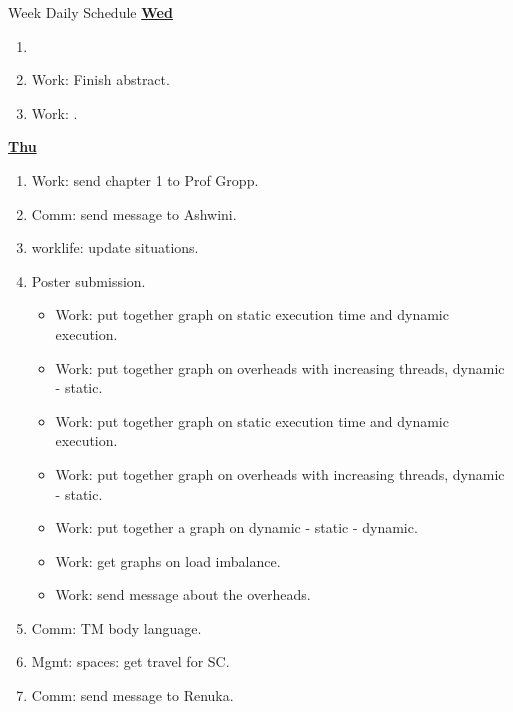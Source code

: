 \documentclass[serif, mathserif, final]{beamer}
\begin{document}
\begin{frame}{}
\begin{columns}
\begin{column}{0.50\linewidth}
\begin{block}{Week Daily Schedule}
\textbf{\small {\underline{Wed}}}
\begin{enumerate} 
\tiny \item \tiny  
\item \tiny Work: Finish abstract. 
\item \tiny Work: .
\end{enumerate} 

\textbf{\small{\underline{Thu}}}
\begin{enumerate} 
\item \tiny Work: send chapter 1 to Prof Gropp.  
\item \tiny Comm: send message to Ashwini.
\item \tiny worklife: update situations.
\item \tiny Poster submission. 

\begin{itemize} 
\tiny \item \tiny Work: put together graph on static execution time and dynamic execution. 
\item \tiny Work: put together graph on overheads with increasing threads,  dynamic - static. 
\end{itemize} 

\begin{itemize} 
\item \tiny Work: put together graph on static execution time and dynamic execution. 
\item \tiny Work: put together graph on overheads with increasing threads,  dynamic - static. 
\item \tiny Work: put together a graph on dynamic - static - dynamic.  
\item \tiny Work: get graphs on load imbalance. 
\item \tiny Work: send message about the overheads.
\end{itemize} 
\item \tiny Comm: TM body language.
\item \tiny Mgmt: spaces: get travel for SC. 
\item \tiny Comm: send message to Renuka.
\end{enumerate}


\end{block}
\end{column}
\end{columns}
\end{frame}
\end{document}
